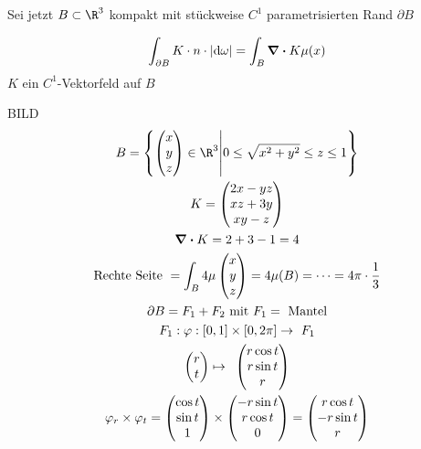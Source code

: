Sei jetzt $B \subset \R^3$ kompakt mit stückweise $C^1$ parametrisierten Rand $\partial B$
\begin{satz*}[note = {Satz von Gauss = Divergenzsatz} , index = Satz von Gauss Divergenz satz in $\R^2$ , indexformat = {3!12~ 1!~23 4.5!~67 1!4-~!~67}]
	\[ \int_{\partial B} K \cdot n \cdot \abs{\dd \omega} = \int_B \div K \mu(x) \]
	$K$ ein $C^1$-Vektorfeld auf $B$
\end{satz*}
\begin{bsp*}
	BILD
	\begin{gather*}
		B = \left\{ \begin{pmatrix} x \\ y \\ z \end{pmatrix} \in \R^3 \middle| 0 \leq \sqrt{x^2 + y^2} \leq z \leq 1 \right\} \\
		K = \begin{pmatrix} 2x - yz \\ xz + 3y \\ xy - z \end{pmatrix} \\
		\div K = 2 + 3 - 1 = 4 \\
		\text{Rechte Seite } = \int_B 4 \mu\begin{pmatrix} x \\ y \\ z \end{pmatrix} = 4 \mu(B) = \dots = 4\pi \cdot \frac{1}{3} \\
		\partial B = F_1 + F_2 \text{ mit } F_1 = \text{ Mantel} \\
		F_1 : \phi : [0,1] \times [0,2\pi] \rightarrow F_1 \\
		\begin{pmatrix} r \\ t \end{pmatrix} \mapsto \begin{pmatrix} r \cos t \\ r \sin t \\ r \end{pmatrix} \\
		\phi_r \times \phi_t = \begin{pmatrix} \cos t \\ \sin t \\ 1 \end{pmatrix} \times \begin{pmatrix} -r \sin t \\ r \cos t \\ 0 \end{pmatrix} = \begin{pmatrix} r \cos t \\ - r \sin t \\ r \end{pmatrix}

\end{gather*}
\end{bsp*}
